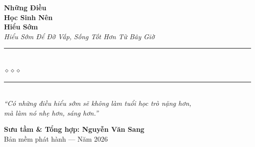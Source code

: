 \begin{titlepage}
\begin{center}
  {\fontsize{28}{34}\selectfont\bfseries\color{inkgray!80!black}
    Những Điều}\\[0.4cm]
  {\fontsize{28}{34}\selectfont\bfseries\color{warmgold!80!black}
    Học Sinh Nên}\\[0.4cm]
  {\fontsize{28}{34}\selectfont\bfseries\color{inkgray!80!black}
    Hiểu Sớm}\\[0.4cm]

  {\fontsize{16}{20}\selectfont\color{warmgold!90!black}\itshape
    Hiểu Sớm Để Đỡ Vấp, Sống Tốt Hơn Từ Bây Giờ}\\[1cm]

  {\color{mossgreen!60}\rule{6cm}{1pt}}\\[5pt]
  {\color{warmgold!80!black}\large$\diamond$\hspace{1cm}$\diamond$\hspace{1cm}$\diamond$}\\[5pt]
  {\color{mossgreen!60}\rule{6cm}{1pt}}\\[1.5cm]

  {\normalsize\itshape\color{mossgreen!90!black}
   ``Có những điều hiểu sớm sẽ không làm tuổi học trò nặng hơn,\\
   mà làm nó nhẹ hơn, sáng hơn.''}

  \vfill

  {\fontsize{16}{20}\selectfont\bfseries\color{mossgreen!90!black}
    Sưu tầm \& Tổng hợp: \textbf{Nguyễn Văn Sang}}\\[0.4cm]

  {\small\color{gray} Bản mềm phát hành --- Năm 2026}\\[0.5cm]
\end{center}

\afterpage{\nopagecolor}
\end{titlepage}